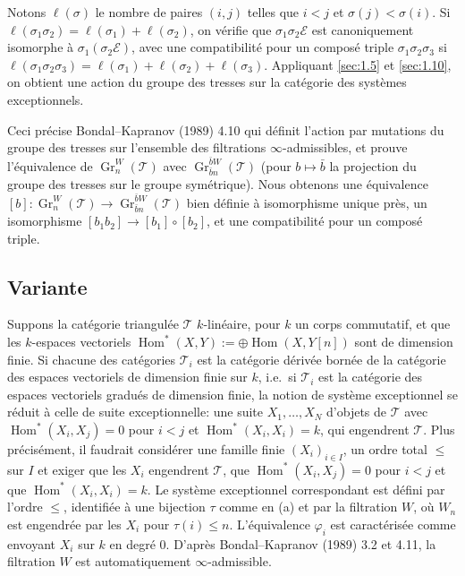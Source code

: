 \documentclass[11pt,a4paper]{article}
\theoremstyle{plain}
\theoremstyle{definition}
\DeclareMathOperator{\Hom}{Hom}
\DeclareMathOperator{\Gr}{Gr}
\newcommand{\cT}{\mathscr{T}}
\newcommand{\cE}{\mathscr{E}}
\begin{document}
Notons $\ell(\sigma)$ le nombre de paires $(i,j)$ telles que $i < j$ et $\sigma(j) < \sigma(i)$. Si $\ell(\sigma_1 \sigma_2) = \ell(\sigma_1) + \ell(\sigma_2)$, on v\'erifie que $\sigma_1 \sigma_2 \cE$ est canoniquement isomorphe \`a $\sigma_1(\sigma_2 \cE)$, avec une compatibilit\'e pour un compos\'e triple $\sigma_1 \sigma_2 \sigma_3$ si $\ell(\sigma_1 \sigma_2 \sigma_3) = \ell(\sigma_1) + \ell(\sigma_2) + \ell(\sigma_3)$. Appliquant \ref{sec:1.5} et \ref{sec:1.10}, on obtient une action du groupe des tresses sur la cat\'egorie des syst\`emes exceptionnels.

Ceci pr\'ecise Bondal--Kapranov (1989) 4.10 qui d\'efinit l'action par mutations du groupe des tresses sur l'ensemble des filtrations $\infty$-admissibles, et prouve l'\'equivalence de $\Gr_n^W(\cT)$ avec $\Gr_{\bar{b}n}^{\bar{b}W}(\cT)$ (pour $b \mapsto \bar{b}$ la projection du groupe des tresses sur le groupe sym\'etrique). Nous obtenons une \'equivalence $[b] : \Gr_n^W(\cT) \to \Gr_{\bar{b}n}^{\bar{b}W}(\cT)$ bien d\'efinie \`a isomorphisme unique pr\`es, un isomorphisme $[b_1 b_2] \to [b_1] \circ [b_2]$, et une compatibilit\'e pour un compos\'e triple.

\subsection*{Variante}

Suppons la cat\'egorie triangul\'ee $\cT$ $k$-lin\'eaire, pour $k$ un corps commutatif, et que les $k$-espaces vectoriels $\Hom^*(X,Y) := \oplus \Hom(X, Y[n])$ sont de dimension finie. Si chacune des cat\'egories $\cT_i$ est la cat\'egorie d\'eriv\'ee born\'ee de la cat\'egorie des espaces vectoriels de dimension finie sur $k$, i.e.\ si $\cT_i$ est la cat\'egorie des espaces vectoriels gradu\'es de dimension finie, la notion de syst\`eme exceptionnel se r\'eduit \`a celle de suite exceptionnelle: une suite $X_1,\ldots,X_N$ d'objets de $\cT$ avec $\Hom^*(X_i, X_j) = 0$ pour $i < j$ et $\Hom^*(X_i, X_i) = k$, qui engendrent $\cT$. Plus pr\'ecis\'ement, il faudrait consid\'erer une famille finie $(X_i)_{i \in I}$, un ordre total $\leq$ sur $I$ et exiger que les $X_i$ engendrent $\cT$, que $\Hom^*(X_i, X_j) = 0$ pour $i < j$ et que $\Hom^*(X_i, X_i) = k$. Le syst\`eme exceptionnel correspondant est d\'efini par l'ordre $\leq$, identifi\'ee \`a une bijection $\tau$ comme en (a) et par la filtration $W$, o\`u $W_n$ est engendr\'ee par les $X_i$ pour $\tau(i) \leq n$. L'\'equivalence $\varphi_i$ est caract\'eris\'ee comme envoyant $X_i$ sur $k$ en degr\'e $0$. D'apr\`es Bondal--Kapranov (1989) 3.2 et 4.11, la filtration $W$ est automatiquement $\infty$-admissible.
\end{document}
